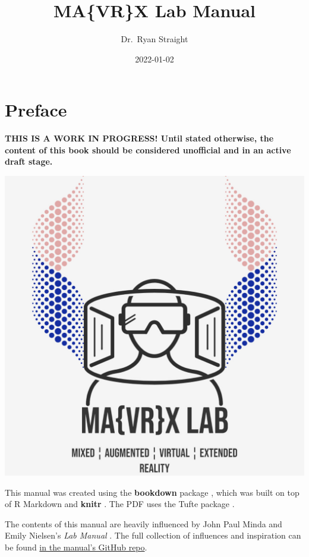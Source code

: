 \documentclass[]{tufte-book}
\title{MA\{VR\}X Lab Manual}
\author{Dr.~Ryan Straight}
\date{2022-01-02}
\begin{document}
\maketitle



{
\hypersetup{linkcolor=black}
\setcounter{tocdepth}{1}
\tableofcontents
}
\listoftables
\listoffigures

\hypertarget{preface}{%
\chapter*{Preface}\label{preface}}

\textbf{THIS IS A WORK IN PROGRESS! Until stated otherwise, the content of this book should be considered unofficial and in an active draft stage.}

\begin{center}\href{https://mavrxlab.org}{\includegraphics{images/square-solid} }\end{center}

This manual was created using the \textbf{bookdown} package \citep{R-bookdown}, which was built on top of R Markdown and \textbf{knitr} \citep{xie2015}. The PDF uses the Tufte package \citep{xieTufteTufteStyles2021}.

The contents of this manual are heavily influenced by John Paul Minda and Emily Nielsen's \emph{Lab Manual} \citeyearpar{Minda_Nielsen_2018}. The full collection of influences and inspiration can be found \href{https://github.com/mavrxlab/lab-manual}{in the manual's GitHub repo}.
\end{document}
